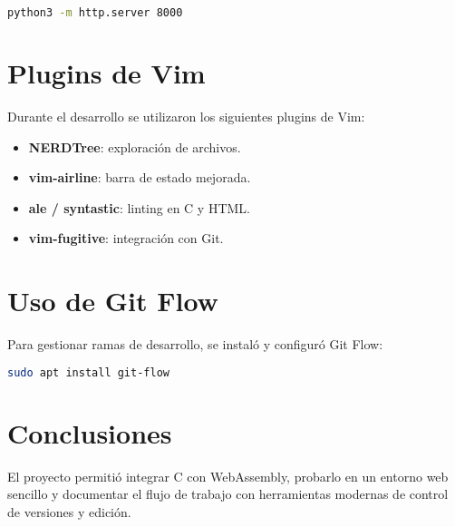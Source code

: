 \documentclass[a4paper,12pt]{article}
\begin{document}
	\begin{lstlisting}[language=bash]
		python3 -m http.server 8000
	\end{lstlisting}
	
	\section{Plugins de Vim}
	Durante el desarrollo se utilizaron los siguientes plugins de Vim:
	
	\begin{itemize}
		\item \textbf{NERDTree}: exploración de archivos.
		\item \textbf{vim-airline}: barra de estado mejorada.
		\item \textbf{ale / syntastic}: linting en C y HTML.
		\item \textbf{vim-fugitive}: integración con Git.
	\end{itemize}
	
	\section{Uso de Git Flow}
	Para gestionar ramas de desarrollo, se instaló y configuró Git Flow:
	
	\begin{lstlisting}[language=bash]
		sudo apt install git-flow
	\end{lstlisting}
	
	\section{Conclusiones}
	El proyecto permitió integrar C con WebAssembly, probarlo en un
	entorno web sencillo y documentar el flujo de trabajo con herramientas
	modernas de control de versiones y edición.
	
\end{document}
